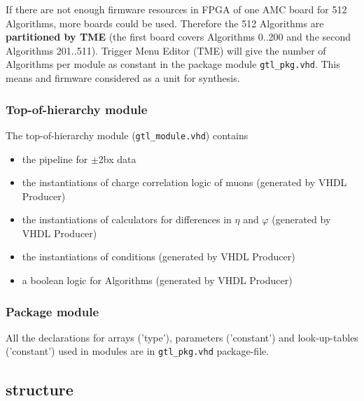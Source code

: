 If there are not enough firmware resources in FPGA of one AMC board for 512 Algorithms, more boards could be used. Therefore the 512 Algorithms are \textbf{partitioned by TME} (\eg the first board covers
Algorithms 0..200 and the second Algorithms 201..511). Trigger Menu Editor (TME) will give the number of Algorithms per module as constant in the package module \texttt{gtl\_pkg.vhd}.
This means \ugtl and \ufdl firmware considered as a unit for synthesis.\\

\subsubsection{Top-of-hierarchy module}
\label{sec:gtl:top_module}

The top-of-hierarchy module (\texttt{gtl\_module.vhd}) contains 
\begin {itemize}
\item the pipeline for $\pm$2bx data
\item the instantiations of charge correlation logic of muons (generated by VHDL Producer)
\item the instantiations of calculators for differences in $\eta$ and $\varphi$ (generated by VHDL Producer)
\item the instantiations of conditions (generated by VHDL Producer)
\item a boolean logic for Algorithms (generated by VHDL Producer)
\end {itemize}

% 
% 

\subsubsection{Package module}
\label{sec:gtl:package_module}

All the declarations for arrays ('type'), parameters ('constant') and look-up-tables ('constant') used in modules are in \texttt{gtl\_pkg.vhd} package-file.

\clearpage

\subsection{\ugtl structure}
\label{sec:gtl:mgtl_structure}

